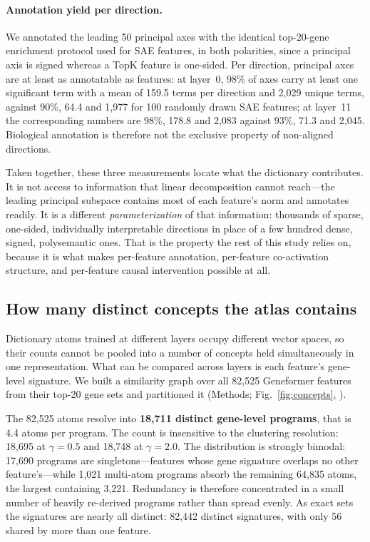 \documentclass[onecolumn,11pt]{article}
\begin{document}
\paragraph{Annotation yield per direction.} We annotated the leading 50 principal axes with the
identical top-20-gene enrichment protocol used for SAE features, in both polarities, since a
principal axis is signed whereas a TopK feature is one-sided. Per direction, principal axes are at
least as annotatable as features: at layer~0, 98\% of axes carry at least one significant term with
a mean of 159.5 terms per direction and 2,029 unique terms, against 90\%, 64.4 and 1,977 for 100
randomly drawn SAE features; at layer~11 the corresponding numbers are 98\%, 178.8 and 2,083 against
93\%, 71.3 and 2,045. Biological annotation is therefore not the exclusive property of
non-aligned directions.

Taken together, these three measurements locate what the dictionary contributes. It is not access to
information that linear decomposition cannot reach---the leading principal subspace contains most of
each feature's norm and annotates readily. It is a different \emph{parameterization} of that
information: thousands of sparse, one-sided, individually interpretable directions in place of a few
hundred dense, signed, polysemantic ones. That is the property the rest of this study relies on,
because it is what makes per-feature annotation, per-feature co-activation structure, and
per-feature causal intervention possible at all.

\subsection*{How many distinct concepts the atlas contains}
\label{sec:concepts}

Dictionary atoms trained at different layers occupy different vector spaces, so their counts cannot
be pooled into a number of concepts held simultaneously in one representation. What can be compared
across layers is each feature's gene-level signature. We built a similarity graph over all 82,525
Geneformer features from their top-20 gene sets and partitioned it (Methods; Fig.~\ref{fig:concepts},
).

The 82,525 atoms resolve into \textbf{18,711 distinct gene-level programs}, that is 4.4 atoms per
program. The count is insensitive to the clustering resolution: 18,695 at $\gamma{=}0.5$ and 18,748
at $\gamma{=}2.0$. The distribution is strongly bimodal: 17,690 programs are singletons---features
whose gene signature overlaps no other feature's---while 1,021 multi-atom programs absorb the
remaining 64,835 atoms, the largest containing 3,221. Redundancy is therefore concentrated in a
small number of heavily re-derived programs rather than spread evenly. As exact sets the signatures
are nearly all distinct: 82,442 distinct signatures, with only 56 shared by more than one feature.
\end{document}
